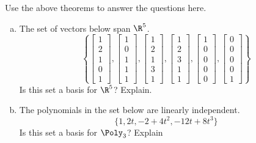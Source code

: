 \begin{exercise} %
	Use the above theorems to answer the questions here.
	\begin{multicols}{2}
		\begin{enumerate}[(a)]
			\item The set of vectors below span $\R^5$.
			$$\left\{
			\begin{bmatrix}1\\2\\1\\0\\1\end{bmatrix},
			\begin{bmatrix}1\\0\\1\\1\\1\end{bmatrix},
			\begin{bmatrix}1\\2\\1\\3\\1\end{bmatrix},
			\begin{bmatrix}1\\2\\3\\1\\1\end{bmatrix},
			\begin{bmatrix}1\\0\\0\\0\\0\end{bmatrix},
			\begin{bmatrix}0\\0\\0\\0\\1\end{bmatrix}
			\right\}$$
			Is this set a basis for $\R^5$? Explain.
			
			\columnbreak
			\item The polynomials in the set below are linearly independent.
			$$ \{1, 2t , -2+4t^2 ,  -12t+8t^3 \} $$
			Is this set a basis for $\Poly_3$? Explain
		\end{enumerate}
	\end{multicols}
\end{exercise}
\vspace{1in}


